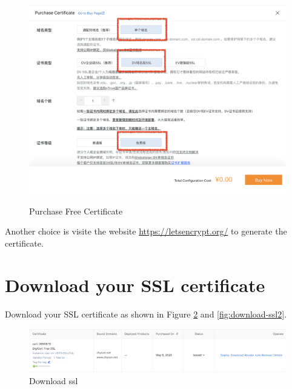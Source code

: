 \begin{figure}[!ht]
  \centering
  \includegraphics[width=\textwidth]{purchase-free-certificate.png}
  \caption{Purchase Free Certificate}
  \label{fig:purchase-free-certificate}
\end{figure}

\begin{tcolorbox}
  Another choice is visite the website  \url{https://letsencrypt.org/} to generate the certificate.  
\end{tcolorbox}


\section{Download your SSL certificate}
Download your SSL certificate as shown in Figure \ref{fig:download-ssl} and \ref{fig:download-ssl2}.

\begin{figure}[!ht]
  \centering
  \includegraphics[width=\textwidth]{download-ssl.png}
  \caption{Download ssl}
  \label{fig:download-ssl}
\end{figure}


